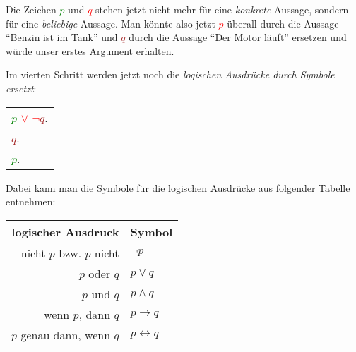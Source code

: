 \documentclass{zusammenfassung}
\begin{document}
Die Zeichen \textcolor{green}{$p$} und \textcolor{red}{$q$} stehen jetzt nicht mehr für eine \emph{konkrete} Aussage, sondern
für eine \emph{beliebige} Aussage. Man könnte also jetzt \textcolor{red}{$p$} überall durch die Aussage "`Benzin ist im Tank"'
und \textcolor{brown}{$q$} durch die Aussage "`Der Motor läuft"' ersetzen und würde unser erstes Argument erhalten.

Im vierten Schritt werden jetzt noch die \emph{logischen Ausdrücke durch Symbole ersetzt}: 

\begin{tabular}{l}
  \textcolor{green}{$p$} \textcolor{red}{$\vee$} \textcolor{red}{$\neg$}\textcolor{brown}{$q$}.\\
  \textcolor{brown}{$q$}.\\
  \arrayrulecolor{red}\hline
  \textcolor{green}{$p$}.
\end{tabular}

Dabei kann man die Symbole für die logischen Ausdrücke aus folgender Tabelle entnehmen:

\begin{center}
  \begin{tabular}{rl}
    \toprule
    logischer Ausdruck&Symbol\\
    \midrule
    nicht $p$ bzw. $p$ nicht&$\neg p$\\
    $p$ oder $q$&$p\vee q$\\
    $p$ und $q$&$p\wedge q$\\
    wenn $p$, dann $q$&$p\rightarrow q$\\
    $p$ genau dann, wenn $q$&$p\leftrightarrow q$\\
    \bottomrule
  \end{tabular}
\end{center}
\end{document}
